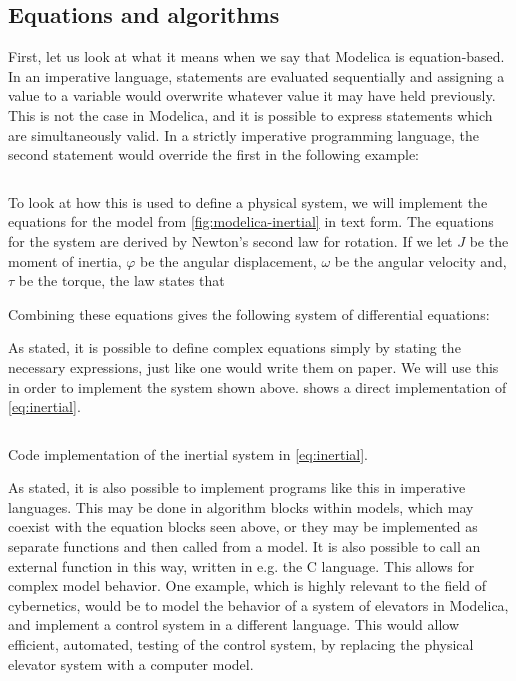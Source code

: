 \documentclass[\rootfolder/main.tex]{subfiles}
\begin{document}
\subsection{Equations and algorithms}

First, let us look at what it means when we say that Modelica is equation-based.
In an imperative language, statements are evaluated sequentially and assigning a value to a variable would overwrite whatever value it may have held previously.
This is not the case in Modelica, and it is possible to express statements which are simultaneously valid.
In a strictly imperative programming language, the second statement would override the first in the following example:

\inputminted{Modelica}{\rootfolder/Chapters/Chapter2/Listings/simultaneous.txt}

To look at how this is used to define a physical system, we will implement the equations for the model from \cref{fig:modelica-inertial} in text form.
The equations for the system are derived by Newton's second law for rotation.
If we let $J$ be the moment of inertia, $\varphi$ be the angular displacement, $\omega$ be the angular velocity and, $\tau$ be the torque, the law states that


Combining these equations gives the following system of differential equations:


As stated, it is possible to define complex equations simply by stating the necessary expressions, just like one would write them on paper.
We will use this in order to implement the system shown above.
 shows a direct implementation of \cref{eq:inertial}.

\begin{listing}[ht]
    \inputminted{Modelica}{\rootfolder/Models/MasterProject/Models/InertialCode.mo}
    \caption{Code implementation of the inertial system in \cref{eq:inertial}.\label{lst:modelica-inertial-code}}
\end{listing}

As stated, it is also possible to implement programs like this in imperative languages.
This may be done in algorithm blocks within models, which may coexist with the equation blocks seen above, or they may be implemented as separate functions and then called from a model.
It is also possible to call an external function in this way, written in e.g. the C language.
This allows for complex model behavior.
One example, which is highly relevant to the field of cybernetics, would be to model the behavior of a system of elevators in Modelica, and implement a control system in a different language.
This would allow efficient, automated, testing of the control system, by replacing the physical elevator system with a computer model.
\end{document}
